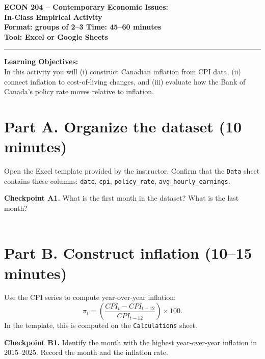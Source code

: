 \documentclass[12pt]{article}
\begin{document}
{\Large \textbf{ECON 204 -- Contemporary Economic Issues: \vspace{0.3cm}\\  In-Class Empirical Activity}}\\[2em]
{\large \textbf{\textbf{Format:} groups of 2--3 \hspace{1.5em} \textbf{Time:} 45--60 minutes \hspace{1.5em}\\ [0.5em]\textbf{Tool:} Excel or Google Sheets}}\\[0.5em]

\hrule
\vspace{0.75em}
\textbf{Learning Objectives:\\} In this activity you will (i) construct Canadian inflation from CPI data, (ii) connect inflation to cost-of-living changes, and (iii) evaluate how the Bank of Canada’s policy rate moves relative to inflation.

\vspace{0.5em}


\section*{Part A. Organize the dataset (10 minutes)}
Open the Excel template provided by the instructor. Confirm that the \texttt{Data} sheet contains these columns: \texttt{date}, \texttt{cpi}, \texttt{policy\_rate}, \texttt{avg\_hourly\_earnings}.

\vspace{0.5em}
\textbf{Checkpoint A1.} What is the first month in the dataset? What is the last month?\\[0.75em]
\underline{\hspace{0.9\linewidth}}\\[0.75em]
\underline{\hspace{0.9\linewidth}}

\section*{Part B. Construct inflation (10--15 minutes)}
Use the CPI series to compute year-over-year inflation:
\[
\pi_t = \left(\frac{CPI_t - CPI_{t-12}}{CPI_{t-12}}\right)\times 100.
\]
In the template, this is computed on the \texttt{Calculations} sheet.

\vspace{0.5em}
\textbf{Checkpoint B1.} Identify the month with the highest year-over-year inflation in 2015--2025. Record the month and the inflation rate.\\[0.75em]
\underline{\hspace{0.9\linewidth}}\\[0.75em]
\underline{\hspace{0.9\linewidth}}
\end{document}
